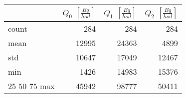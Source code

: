 \begin{tabular}{lrrr}
\toprule
{} &  $Q_0$ $\left[\si{\frac{Bq}{hod}}\right]$ &  $Q_1$ $\left[\si{\frac{Bq}{hod}}\right]$ &  $Q_2$ $\left[\si{\frac{Bq}{hod}}\right]$ \\
\midrule
count &                                       284 &                                       284 &                                       284 \\
mean  &                                     12995 &                                     24363 &                                      4899 \\
std   &                                     10647 &                                     17049 &                                     12467 \\
min   &                                     -1426 &                                    -14983 &                                    -15376 \\
25%
50%
75%
max   &                                     45942 &                                     98777 &                                     50411 \\
\bottomrule
\end{tabular}
